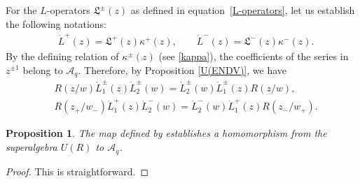\documentclass[pdftex]{sigma}
\numberwithin{equation}{section}
\newtheorem{Proposition}[Theorem]{Proposition}
 { \theoremstyle{definition}
\newtheorem{Definition}[Theorem]{Definition}
\newtheorem{Note}[Theorem]{Note}
\newtheorem{Example}[Theorem]{Example}
\newtheorem{Remark}[Theorem]{Remark} }
\begin{document}
For the $L$-operators $\mathfrak{L}^{\pm}(z)$ as defined in equation~\eqref{L-operators}, let us establish the following notations:
\begin{align*}
 &\dot{L}^+(z)=\mathfrak{L}^+(z)\kappa^{+}(z), \qquad
 \dot{L}^-(z)=\mathfrak{L}^-(z)\kappa^{-}(z).
\end{align*}By the defining relation of $\kappa^{\pm}(z)$ (see \eqref{kappa}), the coefficients of the series in $z^{\pm1}$ belong to $\mathcal{A}_q$. Therefore, by Proposition \ref{U(ENDV)}, we have
\begin{align*}
 &R(z/w)\dot{L}_1^{\pm}(z)\dot{L}_2^{\pm}(w)=\dot{L}_2^{\pm}(w)\dot{L}_1^{\pm}(z) R(z/w),\\
 &R(z_+/w_-)\dot{L}_1^{+}(z)\dot{L}_2^{-}(w)=\dot{L}_2^{-}(w)\dot{L}_1^{+}(z) R(z_-/w_+).
\end{align*}

\begin{Proposition} The map defined by
establishes a homomorphism from the superalgebra $U(R)$ to $\mathcal{A}_q$.
\end{Proposition}
\begin{proof}
This is straightforward.
\end{proof}
\end{document}
